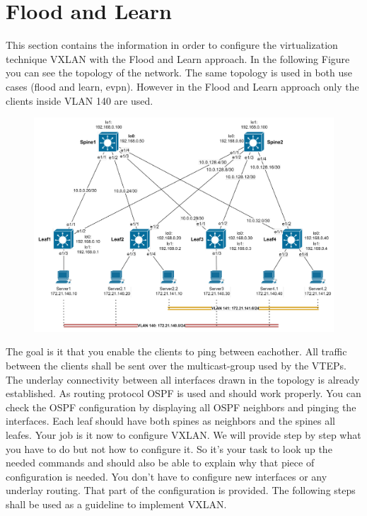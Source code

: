 \documentclass[11pt,titlepage]{article}
\begin{document}
\section{Flood and Learn}
\label{sec:FloodAndLearn}
This section contains the information in order to configure the virtualization technique VXLAN with the Flood and Learn approach.
In the following Figure you can see the topology of the network. The same topology is used in both use cases (flood and learn, evpn). However in the Flood and Learn approach only the
clients inside VLAN 140 are used.
\begin{figure}[H]
	\centering
	\includegraphics[width=0.9\linewidth]{images/topology}
	\caption{}
	\label{fig:topology}
\end{figure}
The goal is it that you enable the clients to ping between eachother. All traffic between the
clients shall be sent over the multicast-group used by the VTEPs.
The underlay connectivity between all interfaces drawn in the topology is already established.
As routing protocol OSPF is used and should work properly. You can check the OSPF configuration
by displaying all OSPF neighbors and pinging the interfaces. Each leaf should have both
spines as neighbors and the spines all leafes. Your job is it now to configure VXLAN. We will
provide step by step what you have to do but not how to configure it. So it’s your task to look
up the needed commands and should also be able to explain why that piece of configuration is needed. You don’t have to configure new interfaces or any underlay routing. That part of the
configuration is provided. The following steps shall be used as a guideline to implement VXLAN.
\end{document}
